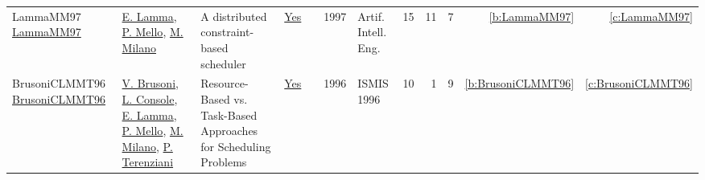 {\begin{longtable}{>{\raggedright\arraybackslash}p{3cm}>{\raggedright\arraybackslash}p{6cm}>{\raggedright\arraybackslash}p{6.5cm}rrrp{2.5cm}rrrrr}
LammaMM97 \href{https://doi.org/10.1016/S0954-1810(96)00002-7}{LammaMM97} & \hyperref[auth:a729]{E. Lamma}, \hyperref[auth:a730]{P. Mello}, \hyperref[auth:a144]{M. Milano} & A distributed constraint-based scheduler & \href{works/LammaMM97.pdf}{Yes} & \cite{LammaMM97} & 1997 & Artif. Intell. Eng. & 15 & 11 & 7 & \ref{b:LammaMM97} & \ref{c:LammaMM97}\\
BrusoniCLMMT96 \href{https://doi.org/10.1007/3-540-61286-6\_157}{BrusoniCLMMT96} & \hyperref[auth:a731]{V. Brusoni}, \hyperref[auth:a732]{L. Console}, \hyperref[auth:a729]{E. Lamma}, \hyperref[auth:a730]{P. Mello}, \hyperref[auth:a144]{M. Milano}, \hyperref[auth:a733]{P. Terenziani} & Resource-Based vs. Task-Based Approaches for Scheduling Problems & \href{works/BrusoniCLMMT96.pdf}{Yes} & \cite{BrusoniCLMMT96} & 1996 & ISMIS 1996 & 10 & 1 & 9 & \ref{b:BrusoniCLMMT96} & \ref{c:BrusoniCLMMT96}\\
\end{longtable}
}

